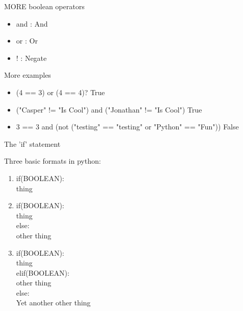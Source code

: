 \documentclass{beamer}
\begin{document}
\begin{frame}{MORE boolean operators}
\pause
\begin{itemize}
  \item[] and : And
  \pause
  \item[] or : Or
  \pause
  \item[] ! : Negate
\end{itemize}
\end{frame}

\begin{frame}{More examples}
\pause
\begin{itemize}
  \item[] (4 == 3) or (4 == 4)? \pause \tab True
  \pause
  \item[] ("Casper" != "Is Cool") and ("Jonathan" != "Is Cool") \pause \tab True
  \pause
  \item[] 3 == 3 and (not ("testing" == "testing" or "Python" == "Fun")) \pause \tab False
\end{itemize}

\end{frame}

\begin{frame}{The 'if' statement}

Three basic formats in python:
\pause
\begin{enumerate}

  \item if(BOOLEAN):\\
            \qquad thing\\
  \pause
  \item if(BOOLEAN):\\
            \qquad thing\\
        else:\\
            \qquad other thing
  \pause
  \item if(BOOLEAN):\\
            \qquad thing\\
        elif(BOOLEAN):\\
            \qquad other thing\\
        else:\\
            \qquad Yet another other thing
  

\end{enumerate}

\end{frame}
\end{document}
